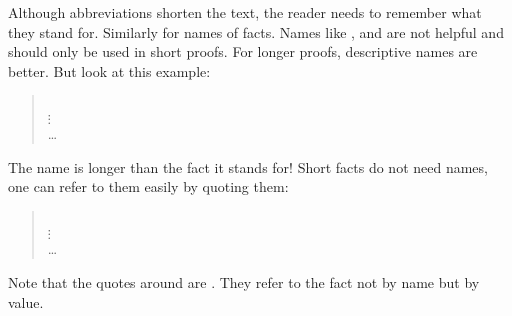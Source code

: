 \begin{isabellebody}
\begin{isamarkuptext}
Although abbreviations shorten the text, the reader needs to remember what
they stand for. Similarly for names of facts. Names like , 
and  are not helpful and should only be used in short proofs. For
longer proofs, descriptive names are better. But look at this example:
\begin{quote}
 \ \\
$\vdots$\\
  \dots
\end{quote}
The name is longer than the fact it stands for! Short facts do not need names,
one can refer to them easily by quoting them:
\begin{quote}
 \ \\
$\vdots$\\
  \dots
\end{quote}
Note that the quotes around  are .
They refer to the fact not by name but by value.

\subsection{}


\end{isamarkuptext}
\end{isabellebody}
